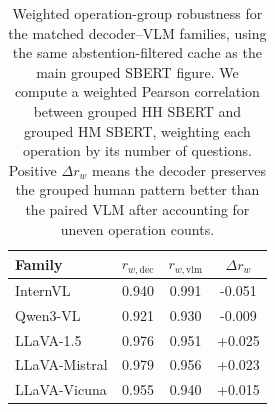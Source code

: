 \begin{table}[t]
\centering
\setlength{\tabcolsep}{4pt}

\caption{Weighted operation-group robustness for the matched decoder--VLM families, using the same abstention-filtered cache as the main grouped SBERT figure. We compute a weighted Pearson correlation between grouped HH SBERT and grouped HM SBERT, weighting each operation by its number of questions. Positive $\Delta r_w$ means the decoder preserves the grouped human pattern better than the paired VLM after accounting for uneven operation counts.}
\label{tab:weighted_group_pattern_robustness}
\begin{tabular}{lccc}
\toprule
\textbf{Family} & \textbf{$r_{w,\mathrm{dec}}$} & \textbf{$r_{w,\mathrm{vlm}}$} & \textbf{$\Delta r_w$} \\
\midrule
InternVL & 0.940 & 0.991 & -0.051 \\
Qwen3-VL & 0.921 & 0.930 & -0.009 \\
LLaVA-1.5 & 0.976 & 0.951 & +0.025 \\
LLaVA-Mistral & 0.979 & 0.956 & +0.023 \\
LLaVA-Vicuna & 0.955 & 0.940 & +0.015 \\
\bottomrule
\end{tabular}
\end{table}
